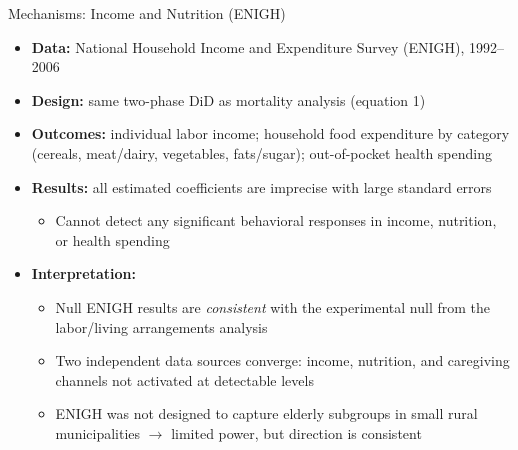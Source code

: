 \documentclass[aspectratio=169,usenames,dvipsnames]{beamer}
\begin{document}

\begin{frame}{Mechanisms: Income and Nutrition (ENIGH)}\label{mechanisms_enigh}
\small
\begin{itemize}
  \item[$\circ$] \textbf{Data:} National Household Income and Expenditure Survey (ENIGH), 1992--2006
  \item[$\circ$] \textbf{Design:} same two-phase DiD as mortality analysis (equation 1)
  \item[$\circ$] \textbf{Outcomes:} individual labor income; household food expenditure by category (cereals, meat/dairy, vegetables, fats/sugar); out-of-pocket health spending
  \vspace{6pt}
  \item[$\circ$] \textbf{Results:} all estimated coefficients are imprecise with large standard errors
    \begin{itemize}
      \item Cannot detect any significant behavioral responses in income, nutrition, or health spending
    \end{itemize}
  \vspace{6pt}
  \item[$\circ$] \textbf{Interpretation:}
    \begin{itemize}
      \item Null ENIGH results are \textit{consistent} with the experimental null from the labor/living arrangements analysis
      \item Two independent data sources converge: income, nutrition, and caregiving channels not activated at detectable levels
      \item ENIGH was not designed to capture elderly subgroups in small rural municipalities $\to$ limited power, but direction is consistent
    \end{itemize}
\end{itemize}
\end{frame}

\end{document}
